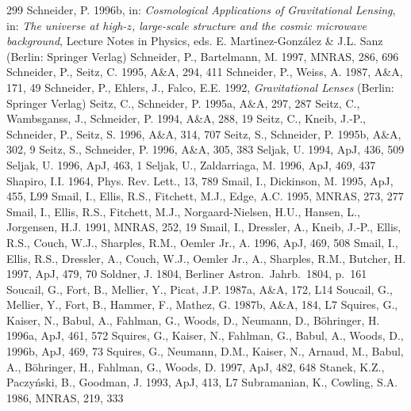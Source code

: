 \documentclass[a4paper,10pt]{article} %
\begin{document}
\begin{thebibliography}{299}
  Schneider, P. 1996b, in: {\em Cosmological Applications of
  Gravitational Lensing\/}, in: {\em The universe at high-$z$,
  large-scale structure and the cosmic microwave background}, Lecture
  Notes in Physics, eds. E. Mart{\'\i}nez-Gonz\'alez \& J.L. Sanz
  (Berlin: Springer Verlag)
  Schneider, P., Bartelmann, M. 1997, MNRAS, 286, 696
  Schneider, P., Seitz, C. 1995, A\&A, 294, 411
  Schneider, P., Weiss, A. 1987, A\&A, 171, 49
  Schneider, P., Ehlers, J., Falco, E.E. 1992, {\em Gravitational
  Lenses\/} (Berlin: Springer Verlag)
  Seitz, C., Schneider, P. 1995a, A\&A, 297, 287
  Seitz, C., Wambsganss, J., Schneider, P. 1994, A\&A, 288, 19
  Seitz, C., Kneib, J.-P., Schneider, P., Seitz, S. 1996, A\&A, 314, 707
  Seitz, S., Schneider, P. 1995b, A\&A, 302, 9
  Seitz, S., Schneider, P. 1996, A\&A, 305, 383
  Seljak, U. 1994, ApJ, 436, 509
  Seljak, U. 1996, ApJ, 463, 1
  Seljak, U., Zaldarriaga, M. 1996, ApJ, 469, 437
  Shapiro, I.I. 1964, Phys. Rev. Lett., 13, 789
  Smail, I., Dickinson, M. 1995, ApJ, 455, L99
  Smail, I., Ellis, R.S., Fitchett, M.J., Edge, A.C. 1995, MNRAS,
  273, 277
  Smail, I., Ellis, R.S., Fitchett, M.J., Norgaard-Nielsen, H.U.,
  Hansen, L., Jorgensen, H.J. 1991, MNRAS, 252, 19
  Smail, I., Dressler, A., Kneib, J.-P., Ellis, R.S., Couch, W.J.,
  Sharples, R.M., Oemler Jr., A. 1996, ApJ, 469, 508
  Smail, I., Ellis, R.S., Dressler, A., Couch, W.J., Oemler Jr., A.,
  Sharples, R.M., Butcher, H. 1997, ApJ, 479, 70
  Soldner, J. 1804, Berliner Astron.\ Jahrb.\ 1804, p.\ 161
  Soucail, G., Fort, B., Mellier, Y., Picat, J.P. 1987a, A\&A, 172,
  L14
  Soucail, G., Mellier, Y., Fort, B., Hammer, F., Mathez, G. 1987b,
  A\&A, 184, L7
  Squires, G., Kaiser, N., Babul, A., Fahlman, G., Woods, D., Neumann,
  D., B\"ohringer, H. 1996a, ApJ, 461, 572
  Squires, G., Kaiser, N., Fahlman, G., Babul, A., Woods, D., 1996b,
  ApJ, 469, 73
  Squires, G., Neumann, D.M., Kaiser, N., Arnaud, M., Babul, A.,
  B\"ohringer, H., Fahlman, G., Woods, D. 1997, ApJ, 482, 648
  Stanek, K.Z., Paczy\'nski, B., Goodman, J. 1993, ApJ, 413, L7
  Subramanian, K., Cowling, S.A. 1986, MNRAS, 219, 333

\end{thebibliography}
\end{document}

